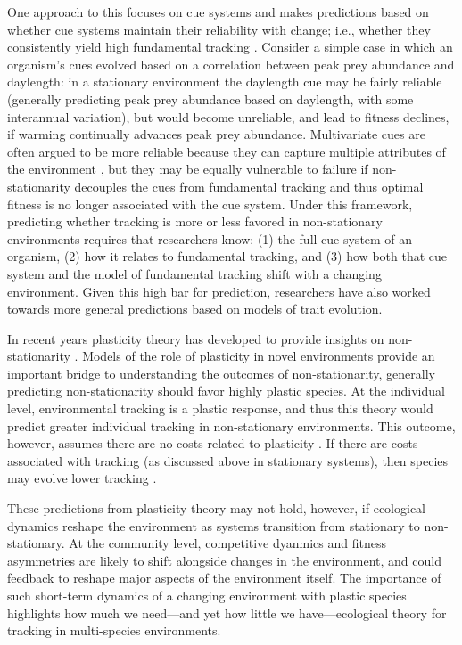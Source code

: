 \documentclass[11pt,letterpaper]{article}
\begin{document}
One approach to this focuses on cue systems and makes predictions based on whether cue systems maintain their reliability with change; i.e., whether they consistently yield high fundamental tracking \citep{bonamour2019}. Consider a simple case in which an organism's cues evolved based on a correlation between peak prey abundance and daylength: in a stationary environment the daylength cue may be fairly reliable (generally predicting peak prey abundance based on daylength, with some interannual variation), but would become unreliable, and lead to fitness declines, if warming continually advances peak prey abundance. Multivariate cues are often argued to be more reliable because they can capture multiple attributes of the environment \citep{dore2018,bonamour2019}, but they may be equally vulnerable to failure if non-stationarity decouples the cues from fundamental tracking \citep{bonamour2019} and thus optimal fitness is no longer associated with the cue system. Under this framework, predicting whether tracking is more or less favored in non-stationary environments requires that researchers know: (1) the full cue system of an organism, (2) how it relates to fundamental tracking, and (3) how both that cue system and the model of fundamental tracking shift with a changing environment. Given this high bar for prediction, researchers have also worked towards more general predictions based on models of trait evolution.

In recent years plasticity theory has developed to provide insights on non-stationarity \citep[or `sustained environmental change,' see][]{chevin2010}. Models of the role of plasticity in novel environments provide an important bridge to understanding the outcomes of non-stationarity, generally predicting non-stationarity should favor highly plastic species. At the individual level, environmental tracking is a plastic response, and thus this theory would predict greater individual tracking in non-stationary environments. This outcome, however, assumes there are no costs related to plasticity \citep{Ghalambor2007,tufto2015}. If there are costs associated with tracking (as discussed above in stationary systems), then species may evolve lower tracking \citep{auld2010}.

These predictions from plasticity theory may not hold, however, if ecological dynamics reshape the environment as systems transition from stationary to non-stationary. At the community level, competitive dyanmics and fitness asymmetries are likely to shift alongside changes in the environment, and could feedback to reshape major aspects of the environment itself. The importance of such short-term dynamics of a changing environment with plastic species highlights how much we need---and yet how little we have---ecological theory for tracking in multi-species environments.
\end{document}
